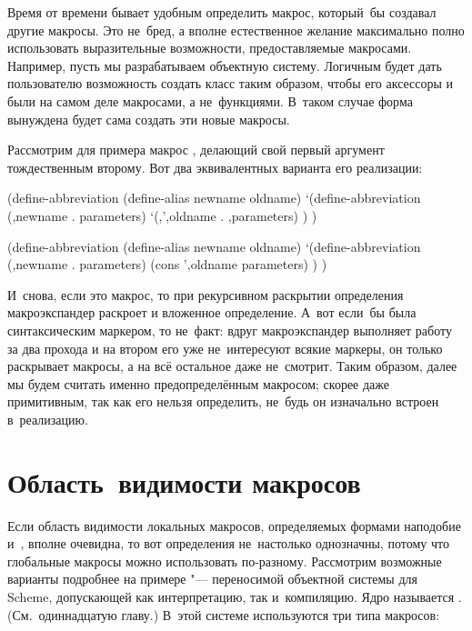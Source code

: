 Время от времени бывает удобным определить макрос, который~бы создавал другие
макросы.  Это не~бред, а вполне естественное
желание максимально полно использовать выразительные возможности,
предоставляемые макросами. Например, пусть мы разрабатываем объектную систему.
Логичным будет дать пользователю возможность создать класс  таким
образом, чтобы его аксессоры  и  были на самом деле
макросами, а не~функциями.  В~таком
случае форма  вынуждена будет сама создать эти новые макросы.

Рассмотрим для примера макрос , делающий свой первый аргумент
тождественным второму. Вот два эквивалентных варианта его реализации:

\begin{code:lisp}
(define-abbreviation (define-alias newname oldname)
  `(define-abbreviation (,newname . parameters)
     `(,',oldname . ,parameters) ) )

(define-abbreviation (define-alias newname oldname)
  `(define-abbreviation (,newname . parameters)
     (cons ',oldname parameters) ) )
\end{code:lisp}

И~снова, если  это макрос, то при рекурсивном раскрытии
определения  макроэкспандер раскроет и вложенное определение.
А~вот если~бы  была синтаксическим маркером, то не~факт:
вдруг макроэкспандер выполняет работу за два прохода и на втором его уже
не~интересуют всякие маркеры, он только раскрывает макросы, а на всё остальное
даже не~смотрит. Таким образом, далее мы будем считать 
именно предопределённым макросом; скорее даже примитивным, так как его нельзя
определить, не~будь он изначально встроен в~реализацию.


\section{Область~видимости макросов}\label{macros/sect:scope}

Если область видимости локальных макросов, определяемых формами наподобие
 и~, вполне очевидна, то вот определения
 не~настолько однозначны, потому что глобальные макросы можно
использовать по-разному. Рассмотрим возможные варианты подробнее на примере
{\Meroon} "--- переносимой объектной системы для Scheme, допускающей как
интерпретацию, так и~компиляцию. Ядро {\Meroon} называется {\Meroonet}.
(См.~одиннадцатую главу.) В~этой системе используются три типа макросов:

